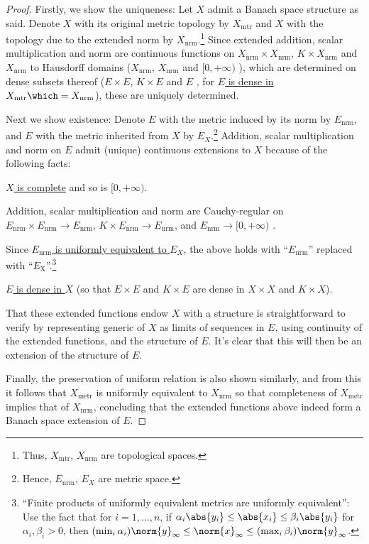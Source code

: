 	\begin{proof}
		Firstly, we show the uniqueness: Let $X$ admit a Banach space structure as said. Denote $X$ with its original metric topology by $X_\text{mtr}$ and $X$ with the topology due to the extended norm by $X_\text{nrm}$.\footnote{
			Thus, $X_\text{mtr}$, $X_\text{nrm}$ are topological spaces.
		} Since extended addition, scalar multiplication and norm are continuous functions \resp on $X_\text{nrm}\times X_\text{nrm}$, $K\times X_\text{nrm}$ and $X_\text{nrm}$ to Hausdorff domains ($X_\text{nrm}$, $X_\text{nrm}$ and $[0, +\infty)$ \resp), which are determined on dense subsets thereof ($E\times E$, $K\times E$ and $E$ \resp, for \uline{$E$ is dense in $X_\text{mtr}\which = X_\text{nrm}$}), these are uniquely determined.
		
		Next we show existence: Denote $E$ with the metric induced by its norm by $E_\text{nrm}$, and $E$ with the metric inherited from $X$ by $E_X$.\footnote{
			Hence, $E_\text{nrm}$, $E_X$ are metric space.
		} Addition, scalar multiplication and norm on $E$ admit (unique) continuous extensions to $X$ because of the following facts:
		\begin{mylist}
			\item \uline{$X$ is complete} and so is $[0, +\infty)$.
			
			\item Addition, scalar multiplication and norm are Cauchy-regular on $E_\text{nrm}\times E_\text{nrm}\to E_\text{nrm}$, $K\times E_\text{nrm}\to E_\text{nrm}$, and $E_\text{nrm}\to[0, +\infty)$ \resp.
			
			\item Since \uline{$E_\text{nrm}$ is uniformly equivalent to $E_X$}, the above holds with ``$E_\text{nrm}$'' replaced with ``$E_\text{X}$''.\footnote{
				``Finite products of uniformly equivalent metrics are uniformly equivalent'': Use the fact that for $i = 1, \ldots, n$, if $\alpha_i\abs{y_i}\le \abs{x_i}\le\beta_i\abs{y_i}$ for $\alpha_i, \beta_i > 0$, then $(\min_i \alpha_i) \norm{y}_\infty
				\le\norm{x}_\infty
				\le(\max_i\beta_i) \norm{y}_\infty$.
			}
			
			\item \uline{$E$ is dense in $X$} (so that $E\times E$ and $K\times E$ are \resp dense in $X\times X$ and $K\times X$).
		\end{mylist}
		That these extended functions endow $X$ with a \NLS structure is straightforward to verify by representing generic  of $X$ as limits of sequences in $E$, using continuity of the extended functions, and the \NLS structure of $E$. It's clear that this will then be an extension of the \NLS structure of $E$.
		
		Finally, the preservation of uniform relation is also shown similarly, and from this it follows that $X_\text{metr}$ is uniformly equivalent to $X_\text{nrm}$ so that completeness of $X_\text{metr}$ implies that of $X_\text{nrm}$, concluding that the extended functions above indeed form a Banach space extension of $E$.
	\end{proof}
	
